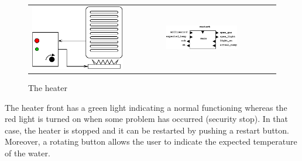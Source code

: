 \documentclass[11pt,titlepage,twoside]{report}
\begin{document}
\begin{figure}
\begin{center}
\begin{tabular}{cc}
\includegraphics{Fig/heater}
&
\includegraphics[width=0.5\textwidth]{Fig/heater_control}
\end{tabular}
\end{center}
\caption{The heater}\label{figure-heater}
\end{figure}

The heater front has a green light indicating a normal
functioning whereas the red light is turned on when some problem has
occurred (security stop). In that case, the heater is stopped and it can be restarted
by pushing a restart button.  Moreover, a rotating button allows the
user to indicate the expected temperature of the water.
\end{document}
